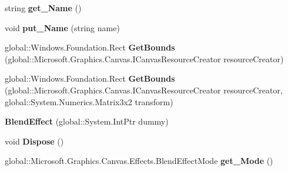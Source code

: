 \begin{DoxyCompactItemize}
\item 
\mbox{\label{class_microsoft_1_1_graphics_1_1_canvas_1_1_effects_1_1_blend_effect_ae6a348ba6554e025e0079757f11fc876}} 
string {\bfseries get\+\_\+\+Name} ()
\item 
\mbox{\label{class_microsoft_1_1_graphics_1_1_canvas_1_1_effects_1_1_blend_effect_a1a62a28a8ed5733d966ad494c3936511}} 
void {\bfseries put\+\_\+\+Name} (string name)
\item 
\mbox{\label{class_microsoft_1_1_graphics_1_1_canvas_1_1_effects_1_1_blend_effect_a7a22f733debb5fcc64e20a7ef9d6c633}} 
global\+::\+Windows.\+Foundation.\+Rect {\bfseries Get\+Bounds} (global\+::\+Microsoft.\+Graphics.\+Canvas.\+I\+Canvas\+Resource\+Creator resource\+Creator)
\item 
\mbox{\label{class_microsoft_1_1_graphics_1_1_canvas_1_1_effects_1_1_blend_effect_aeaac7a44c02206f0c747d639ddf8c73a}} 
global\+::\+Windows.\+Foundation.\+Rect {\bfseries Get\+Bounds} (global\+::\+Microsoft.\+Graphics.\+Canvas.\+I\+Canvas\+Resource\+Creator resource\+Creator, global\+::\+System.\+Numerics.\+Matrix3x2 transform)
\item 
\mbox{\label{class_microsoft_1_1_graphics_1_1_canvas_1_1_effects_1_1_blend_effect_aacace451098126cd26608dce234e9905}} 
{\bfseries Blend\+Effect} (global\+::\+System.\+Int\+Ptr dummy)
\item 
\mbox{\label{class_microsoft_1_1_graphics_1_1_canvas_1_1_effects_1_1_blend_effect_a5d0e95366e1252da3cf90f1d61cd0935}} 
void {\bfseries Dispose} ()
\item 
\mbox{\label{class_microsoft_1_1_graphics_1_1_canvas_1_1_effects_1_1_blend_effect_ab50bbe9eaad5189343a4e0dc8958294a}} 
global\+::\+Microsoft.\+Graphics.\+Canvas.\+Effects.\+Blend\+Effect\+Mode {\bfseries get\+\_\+\+Mode} ()

\end{DoxyCompactItemize}
